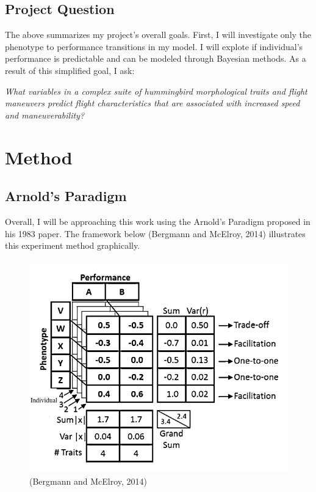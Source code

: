 \documentclass[
  letterpaper,
  DIV=11,
  numbers=noendperiod]{scrartcl}
\begin{document}
\hypertarget{project-question}{%
\subsection{Project Question}\label{project-question}}

The above summarizes my project's overall goals. First, I will
investigate only the phenotype to performance transitions in my model. I
will explote if individual's performance is predictable and can be
modeled through Bayesian methods. As a result of this simplified goal, I
ask:

\emph{What variables in a complex suite of hummingbird morphological
traits and flight maneuvers predict flight characteristics that are
associated with increased speed and maneuverability?}

\hypertarget{method}{%
\section{Method}\label{method}}

\hypertarget{arnolds-paradigm}{%
\subsection{Arnold's Paradigm}\label{arnolds-paradigm}}

Overall, I will be approaching this work using the Arnold's Paradigm
proposed in his 1983 paper. The framework below (Bergmann and McElroy,
2014) illustrates this experiment method graphically.

\begin{figure}

{\centering \includegraphics{matrix_test.png}

}

\caption{(Bergmann and McElroy, 2014)}

\end{figure}
\end{document}
